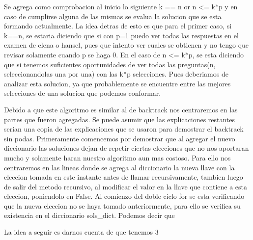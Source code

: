 \documentclass[a4paper, 12pt]{article}
\begin{document}
Se agrega como comprobacion al inicio lo siguiente k == n or n <= k*p y en caso de cumplirse alguna de las mismas se evalua la solucion que se esta formando actualmente. La idea detras de esto es que para el primer caso, si k==n, se estaria diciendo que si con p=1 puedo ver todas las respuestas en el examen de elena o hansel, pues que intento ver cuales se obtienen y no tengo que revisar solamente cuando p se haga 0.
En el caso de n <= k*p, se esta diciendo que si tenemos suficientes oportunidades de ver todas las preguntas(n, seleccionandolas una por una) con las k*p selecciones. Pues deberiamos de analizar esta solucion, ya que probablemente se encuentre entre las mejores selecciones de una solucion que podemos conformar.

Debido a que este algoritmo es similar al de backtrack nos centraremos en las partes que fueron agregadas. Se puede asumir que las explicaciones restantes serian una copia de las explicaciones que se usaron para demostrar el backtrack sin podas.
Primeramente comencemos por demostrar que al agregar el nuevo diccionario las soluciones dejan de repetir ciertas elecciones que no nos aportaran mucho y solamente haran nuestro algoritmo aun mas costoso.
Para ello nos centraremos en las lineas donde se agrega al diccionario la nueva llave con la eleccion tomada en este instante antes de llamar recursivamente, tambien luego de salir del metodo recursivo, al modificar el valor en la llave que contiene a esta eleccion, poniendolo en False.
Al comienzo del doble ciclo for se esta verificando que la nueva eleccion no se haya tomado anteriormente, para ello se verifica su existencia en el diccionario sols_dict. 
Podemos decir que 


La idea a seguir es darnos cuenta de que tenemos 3 
\end{document}
